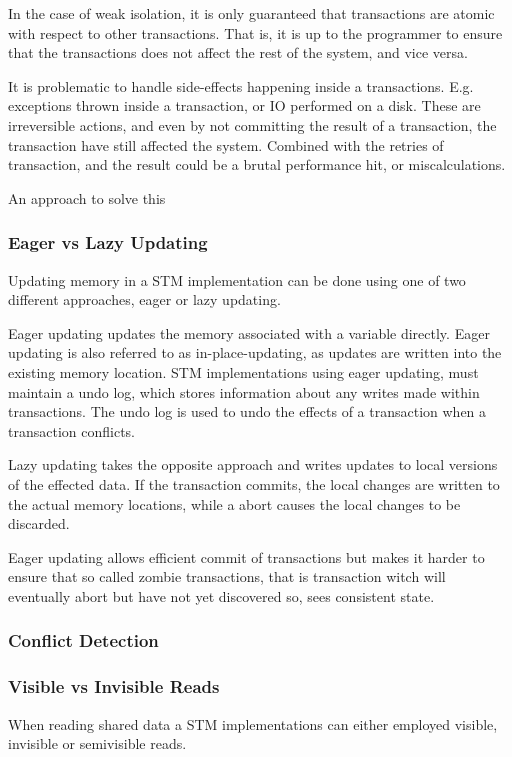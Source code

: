 In the case of weak isolation, it is only guaranteed that transactions are atomic with respect to other transactions. That is, it is up to the programmer to ensure that the transactions does not affect the rest of the system, and vice versa. 


It is problematic to handle side-effects happening inside a transactions. E.g. exceptions thrown inside a transaction, or \ac{IO} performed on a disk. These are irreversible actions, and even by not committing the result of a transaction, the transaction have still affected the system. Combined with the retries of transaction, and the result could be a brutal performance hit, or miscalculations.

An approach to solve this

\subsubsection{Eager vs Lazy Updating}
Updating memory in a \ac{STM} implementation can be done using one of two different approaches, eager or lazy updating.

Eager updating updates the memory associated with a variable directly. Eager updating is also referred to as in-place-updating, as updates are written into the existing memory location\cite[p. 35]{afek2011lowering}. \ac{STM} implementations using eager updating, must maintain a undo log, which stores information about any writes made within transactions. The undo log is used to undo the effects of a transaction when a transaction conflicts\cite[p. 2084]{herlihy2011tm}.

Lazy updating takes the opposite approach and writes updates to local versions of the effected data\cite[p. 2084]{herlihy2011tm}. If the transaction commits, the local changes are written to the actual memory locations, while a abort causes the local changes to be discarded.

Eager updating allows efficient commit of transactions but makes it harder to ensure that so called zombie transactions, that is transaction witch will eventually abort but have not yet discovered so, sees consistent state\cite[p. 2084]{herlihy2011tm}.
\subsubsection{Conflict Detection}
\subsubsection{Visible vs Invisible Reads}
When reading shared data a \ac{STM} implementations can either employed visible, invisible or semivisible reads.

